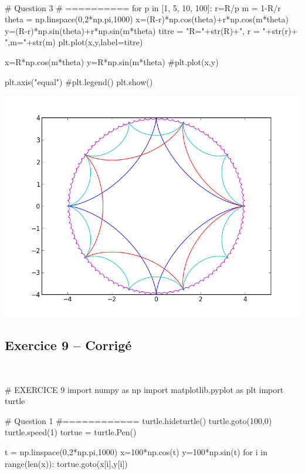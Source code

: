 \documentclass[10pt,fleqn]{article} %
\begin{document}
\begin{corrige}
$\quad$
\begin{python}
# Question 3
# ==========
for p in [1, 5, 10, 100]:
    r=R/p
    m = 1-R/r
    theta = np.linspace(0,2*np.pi,1000)
    x=(R-r)*np.cos(theta)+r*np.cos(m*theta)
    y=(R-r)*np.sin(theta)+r*np.sin(m*theta)
    titre = "R="+str(R)+", r = "+str(r)+ ",m="+str(m)
    plt.plot(x,y,label=titre)

x=R*np.cos(m*theta)
y=R*np.sin(m*theta)
#plt.plot(x,y)

plt.axis("equal")
#plt.legend()
plt.show()
\end{python}
\end{corrige}

\begin{center}
\includegraphics[width=.4\linewidth]{images/exo_FB_07_2}
\end{center}




\subsection*{Exercice 9 -- Corrigé}

\begin{corrige}
$\quad$
\begin{python}
# EXERCICE 9
import numpy as np
import matplotlib.pyplot as plt
import turtle

# Question 1 
#============
turtle.hideturtle()
turtle.goto(100,0)
turtle.speed(1)
tortue = turtle.Pen()

t = np.linspace(0,2*np.pi,1000)
x=100*np.cos(t)
y=100*np.sin(t)
for i in range(len(x)):
    tortue.goto(x[i],y[i])
\end{python}
\end{corrige}
\end{document}
